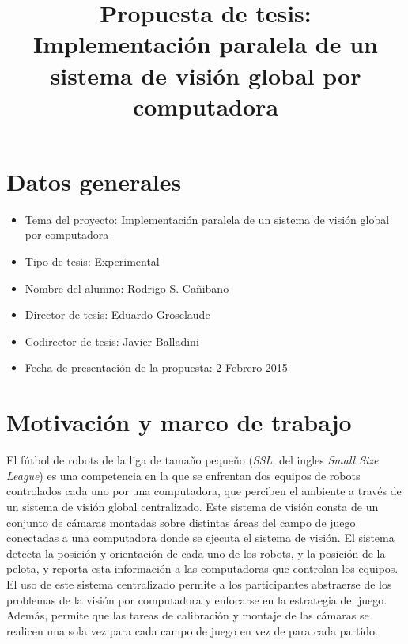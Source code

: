 \documentclass[a4paper]{article}
\title{Propuesta de tesis:\\ Implementación paralela de un sistema de visión global
por computadora}
\author{}
\date{}
\begin{document}
\maketitle

\section{Datos generales}

\begin{itemize}

	\item{Tema del proyecto: Implementación paralela de un sistema de visión
		global por computadora}

	\item{Tipo de tesis: Experimental}

	\item{Nombre del alumno: Rodrigo S. Cañibano}

	\item{Director de tesis: Eduardo Grosclaude}

	\item{Codirector de tesis: Javier Balladini}

	\item{Fecha de presentación de la propuesta: 2 Febrero 2015}

\end{itemize}

\section{Motivación y marco de trabajo}

El fútbol de robots de la liga de tamaño pequeño (\emph{SSL}, del ingles
\emph{Small Size League})\cite{sslrules2014} es una competencia en la que se
enfrentan dos equipos de robots controlados cada uno por una computadora, que
perciben el ambiente a través de un sistema de visión global centralizado. Este
sistema de visión consta de un conjunto de cámaras montadas sobre distintas
áreas del campo de juego conectadas a una computadora donde se ejecuta el
sistema de visión. El sistema detecta la posición y orientación de cada uno de
los robots, y la posición de la pelota, y reporta esta información a las
computadoras que controlan los equipos. El uso de este sistema centralizado
permite a los participantes abstraerse de los problemas de la visión por
computadora y enfocarse en la estrategia del juego. Además, permite que las
tareas de calibración y montaje de las cámaras se realicen una sola vez para
cada campo de juego en vez de para cada partido.
\end{document}
